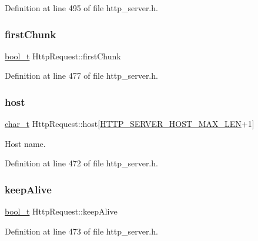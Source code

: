Definition at line 495 of file http\+\_\+server.\+h.

\mbox{\label{structHttpRequest_a6919525cf5fbc4de85306b2a76ba9066}} 
\subsubsection{\texorpdfstring{first\+Chunk}{firstChunk}}
{\footnotesize\ttfamily \hyperlink{compiler__port_8h_a812d16e5494522586b3784e55d479912}{bool\+\_\+t} Http\+Request\+::first\+Chunk}



Definition at line 477 of file http\+\_\+server.\+h.

\mbox{\label{structHttpRequest_a883daf02294a853d0e2e4c0169576ec1}} 
\subsubsection{\texorpdfstring{host}{host}}
{\footnotesize\ttfamily \hyperlink{compiler__port_8h_a40bb5262bf908c328fbcfbe5d29d0201}{char\+\_\+t} Http\+Request\+::host\mbox{[}\hyperlink{http__server_8h_a69b97c891333388e6ed2ff330fd9aa94}{H\+T\+T\+P\+\_\+\+S\+E\+R\+V\+E\+R\+\_\+\+H\+O\+S\+T\+\_\+\+M\+A\+X\+\_\+\+L\+EN}+1\mbox{]}}



Host name. 



Definition at line 472 of file http\+\_\+server.\+h.

\mbox{\label{structHttpRequest_ac436a62d3c0ae60ce7a1219a3c7c2b02}} 
\subsubsection{\texorpdfstring{keep\+Alive}{keepAlive}}
{\footnotesize\ttfamily \hyperlink{compiler__port_8h_a812d16e5494522586b3784e55d479912}{bool\+\_\+t} Http\+Request\+::keep\+Alive}



Definition at line 473 of file http\+\_\+server.\+h.


